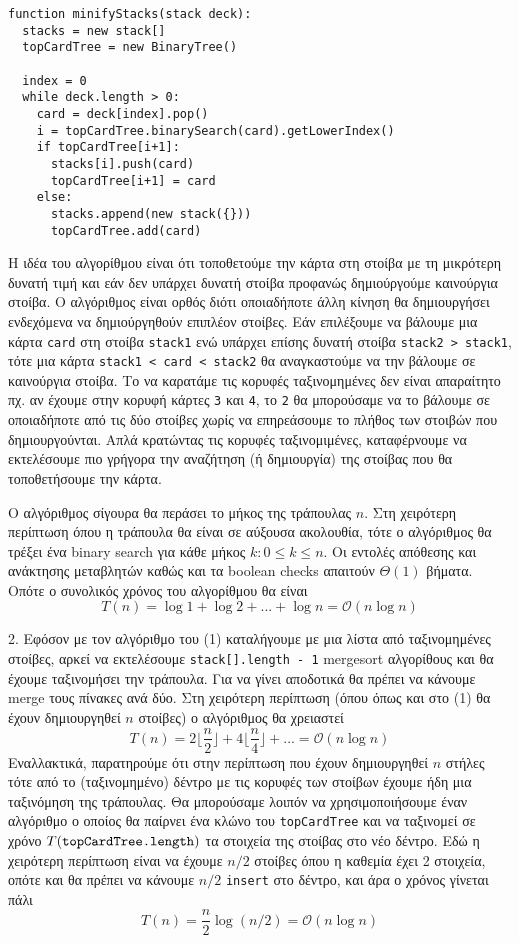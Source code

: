 \documentclass[a4paper,11pt]{article}
\begin{document}
\begin{verbatim}
function minifyStacks(stack deck):
  stacks = new stack[]
  topCardTree = new BinaryTree()

  index = 0
  while deck.length > 0:
    card = deck[index].pop()
    i = topCardTree.binarySearch(card).getLowerIndex()
    if topCardTree[i+1]:
      stacks[i].push(card)
      topCardTree[i+1] = card
    else:
      stacks.append(new stack({}))
      topCardTree.add(card)
\end{verbatim}

Η ιδέα του αλγορίθμου είναι ότι τοποθετούμε την κάρτα στη στοίβα με τη μικρότερη δυνατή τιμή και εάν δεν υπάρχει δυνατή στοίβα προφανώς δημιούργούμε καινούργια στοίβα. Ο αλγόριθμος είναι ορθός διότι οποιαδήποτε άλλη κίνηση θα δημιουργήσει ενδεχόμενα να δημιούργηθούν επιπλέον στοίβες. Εάν επιλέξουμε να βάλουμε μια κάρτα \verb|card| στη στοίβα \verb|stack1| ενώ υπάρχει επίσης δυνατή στοίβα \verb|stack2 > stack1|, τότε μια κάρτα \verb|stack1 < card < stack2| θα αναγκαστούμε να την βάλουμε σε καινούργια στοίβα. Το να καρατάμε τις κορυφές ταξινομημένες δεν είναι απαραίτητο πχ. αν έχουμε στην κορυφή κάρτες \verb|3| και \verb|4|, το \verb|2| θα μπορούσαμε να το βάλουμε σε οποιαδήποτε από τις δύο στοίβες χωρίς να επηρεάσουμε το πλήθος των στοιβών που δημιουργούνται. Απλά κρατώντας τις κορυφές ταξινομιμένες, καταφέρνουμε να εκτελέσουμε πιο γρήγορα την αναζήτηση (ή δημιουργία) της στοίβας που θα τοποθετήσουμε την κάρτα.

Ο αλγόριθμος σίγουρα θα περάσει το μήκος της τράπουλας $n$. Στη χειρότερη περίπτωση όπου η τράπουλα θα είναι σε αύξουσα ακολουθία, τότε ο αλγόριθμος θα τρέξει ένα binary search για κάθε μήκος $k: 0 \leq k \leq n$. Οι εντολές απόθεσης και ανάκτησης μεταβλητών καθώς και τα boolean checks απαιτούν $\Theta(1)$ βήματα. Οπότε ο συνολικός χρόνος του αλγορίθμου θα είναι
$$T(n) = \log{1} + \log{2} + ... + \log{n} = \mathcal{O}(n\log{n})$$

2. Εφόσον με τον αλγόριθμο του (1) καταλήγουμε με μια λίστα από ταξινομημένες στοίβες, αρκεί να εκτελέσουμε \verb|stack[].length - 1| mergesort αλγορίθους και θα έχουμε ταξινομήσει την τράπουλα. Για να γίνει αποδοτικά θα πρέπει να κάνουμε merge τους πίνακες ανά δύο. Στη χειρότερη περίπτωση (όπου όπως και στο (1) θα έχουν δημιουργηθεί $n$ στοίβες) ο αλγόριθμος θα χρειαστεί
$$T(n) = 2\lfloor\frac{n}{2}\rfloor + 4\lfloor\frac{n}{4}\rfloor + ... = \mathcal{O}(n\log{n})$$
Εναλλακτικά, παρατηρούμε ότι στην περίπτωση που έχουν δημιουργηθεί $n$ στήλες τότε από το (ταξινομημένο) δέντρο με τις κορυφές των στοίβων έχουμε ήδη μια ταξινόμηση της τράπουλας. Θα μπορούσαμε λοιπόν να χρησιμοποιήσουμε έναν αλγόριθμο ο οποίος θα παίρνει ένα κλώνο του \verb|topCardTree| και να ταξινομεί σε χρόνο $T(\verb|topCardTree.length|)$ τα στοιχεία της στοίβας στο νέο δέντρο. Εδώ η χειρότερη περίπτωση είναι να έχουμε $n/2$ στοίβες όπου η καθεμία έχει 2 στοιχεία, οπότε και θα πρέπει να κάνουμε $n/2$ \verb|insert| στο δέντρο, και άρα ο χρόνος γίνεται πάλι
$$T(n) = \frac{n}{2}\log{(n/2)} = \mathcal{O}(n\log{n})$$
\end{document}
